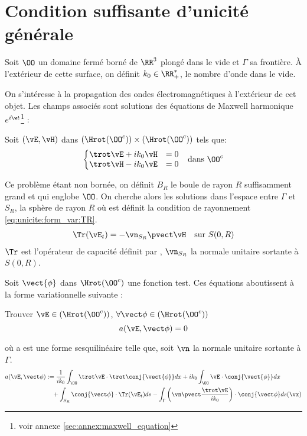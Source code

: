 \section{Condition suffisante d'unicité générale}

  Soit \(\OO\) un domaine fermé borné de \(\RR^3\) plongé dans le vide et \(\Gamma\) sa frontière.
  À l'extérieur de cette surface, on définit \(k_0 \in \RR_+^*\), le nombre d'onde dans le vide.

  On s’intéresse à la propagation des ondes électromagnétiques à l'extérieur de cet objet. Les champs associés sont solutions des équations de Maxwell harmonique \(e^{i\w t}\)\footnote{voir annexe \ref{sec:annex:maxwell_equation}} :

  Soit \((\vE,\vH)\) dans \((\Hrot(\OO^c)) \times (\Hrot(\OO^c))\) tels que:
  \begin{align}
  \left\lbrace
    \begin{matrix}
      \trot \vE + i k_0 \vH &= 0
      \\
      \trot \vH - i k_0 \vE &= 0
    \end{matrix}
    \right. && \text{dans \(\OO^c\)}
  \end{align}

  Ce problème étant non bornée, on définit \(B_R\) le boule de rayon \(R\) suffisamment grand et qui englobe \(\OO\). On cherche alors les solutions dans l'espace entre \(\Gamma\) et \(S_R\), la sphère de rayon \(R\) où est définit la condition de rayonnement \eqref{eq:unicite:form_var:TR}.
  \begin{equation}
    \label{eq:unicite:form_var:TR}
    \begin{aligned}
    \Tr(\vE_t) = - \vn_{S_R} \pvect \vH && \text{sur \(S(0,R)\)}
    \end{aligned}
  \end{equation}
  \(\Tr\) est l'opérateur de capacité définit par \cite[p.~200]{nedelec_acoustic_2001}, \(\vn_{S_R}\) la normale unitaire sortante à \(S(0,R)\).

  Soit \(\vect{\phi}\) dans \(\Hrot(\OO^c)\) une fonction test. Ces équations aboutissent à la forme variationnelle suivante :
  \begin{prop}
    Trouver \(\vE \in \left(\Hrot(\OO^c)\right)\), \(\forall \vect \phi \in \left(\Hrot(\OO^c)\right)\)
    \[
      a(\vE,\vect\phi) = 0
    \]
  \end{prop}

  où a est une forme sesquilinéaire telle que, soit \(\vn\) la normale unitaire sortante à \(\Gamma\).
  \begin{equation*}
    \begin{aligned}
    a(\vE,\vect\phi) &:=  \frac{1}{ik_0} \int_\OO \trot \vE \cdot \trot \conj{\vect{\phi}} dx + ik_0\int_\OO\vE\cdot\conj{\vect{\phi}} dx
      \\ 
      & \quad + \int_{S_R} \conj{ \vect \phi } \cdot \Tr(\vE_t)ds - \int_\Gamma \left(\vn \pvect \frac{\trot \vE}{ik_0}\right) \cdot \conj{\vect \phi} ds(\vx)
    \end{aligned}
   \end{equation*}


